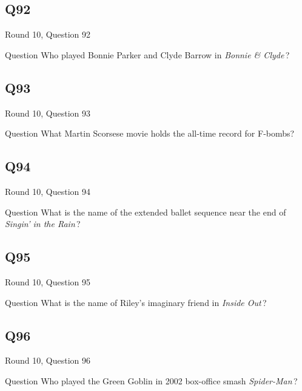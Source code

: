\documentclass[11pt]{beamer}
\begin{document}
\subsection*{Q92}
\begin{frame}[t]{Round 10, Question 92}
\vspace{2em}
\begin{block}{Question}
Who played Bonnie Parker and Clyde Barrow in \emph{Bonnie \& Clyde}\,?
\end{block}
\end{frame}
    

\subsection*{Q93}
\begin{frame}[t]{Round 10, Question 93}
\vspace{2em}
\begin{block}{Question}
What Martin Scorsese movie holds the all-time record for F-bombs?
\end{block}
\end{frame}
    

\subsection*{Q94}
\begin{frame}[t]{Round 10, Question 94}
\vspace{2em}
\begin{block}{Question}
What is the name of the extended ballet sequence near the end of \emph{Singin' in the Rain}\,?
\end{block}
\end{frame}
    

\subsection*{Q95}
\begin{frame}[t]{Round 10, Question 95}
\vspace{2em}
\begin{block}{Question}
What is the name of Riley's imaginary friend in \emph{Inside Out}\,?
\end{block}
\end{frame}
    

\subsection*{Q96}
\begin{frame}[t]{Round 10, Question 96}
\vspace{2em}
\begin{block}{Question}
Who played the Green Goblin in 2002 box-office smash \emph{Spider-Man}\,?
\end{block}
\end{frame}
    
\end{document}
